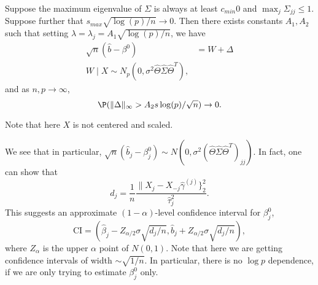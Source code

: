 \documentclass[a4paper]{article}
\begin{document}
\begin{thm}
  Suppose the maximum eigenvalue of $\Sigma$ is always at least $c_{min}  0$ and $\max_j \Sigma_{jj} \leq 1$. Suppose further that $s_{max} \sqrt{\log (p)/n} \to 0$. Then there exists constants $A_1, A_2$ such that setting $\lambda = \lambda_j = A_1 \sqrt{\log(p) /n}$, we have
  \begin{align*}
    \sqrt{n} (\hat{b} - \beta^0) &= W + \Delta\\
    W\mid X \sim N_p(0, \sigma^2 \hat{\Theta} \hat{\Sigma} \hat{\Theta}^T),
  \end{align*}
  and as $n, p \to \infty$,
  \[
    \P(\|\Delta\|_\infty > A_2 s \log(p)/\sqrt{n}) \to 0.
  \]
\end{thm}
Note that here $X$ is not centered and scaled.

We see that in particular, $\sqrt{n}(\hat{b}_j - \beta_j^0) \sim N(0, \sigma^2(\hat{\Theta} \hat{\Sigma} \hat{\Theta}^T)_{jj})$. In fact, one can show that
\[
  d_j = \frac{1}{n} \frac{\|X_j - X_{-j} \hat{\gamma}^{(j)}\}_2^2}{\hat{\tau}_j^2}.
\]
This suggests an approximate $(1 - \alpha)$-level confidence interval for $\beta^0_j$,
\[
  \mathrm{CI} = (\hat{\beta}_j - Z_{\alpha/2} \sigma \sqrt{d_j/n}, \hat{b}_j + Z_{\alpha/2} \sigma \sqrt{d_j/n}),
\]
where $Z_\alpha$ is the upper $\alpha$ point of $N(0, 1)$. Note that here we are getting confidence intervals of width $\sim \sqrt{1/n}$. In particular, there is no $\log p$ dependence, if we are only trying to estimate $\beta^0_j$ only.
\end{document}

